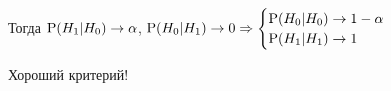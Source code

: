 Тогда $\P(H_1|H_0)\rightarrow\alpha$, $\P(H_0|H_1)\rightarrow0 \Rightarrow
\begin{cases}
    \P(H_0|H_0)\rightarrow1-\alpha \\
    \P(H_1|H_1)\rightarrow1
\end{cases} 
$

Хороший критерий!

